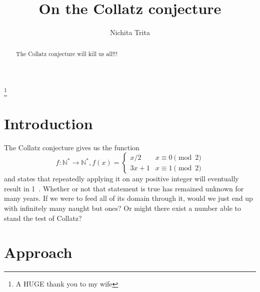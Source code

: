 \documentclass{proc-l}
\theoremstyle{definition}
\theoremstyle{remark}
\numberwithin{equation}{section}
\begin{document}
\title{On the Collatz conjecture}


\author{Nichita Trita}
\address{Metalurgiei 132, Bloc A, ap. 54, Bucharest, Romania}
\thanks{A HUGE thank you to my wife}






\begin{abstract}
The Collatz conjecture will kill us all!!!
\end{abstract}

\maketitle


\section{Introduction}

The Collatz conjecture gives us the function 
\[f : \mathbb{N}^{*} \rightarrow \mathbb{N}^{*}, f(x) = 
\begin{cases}
	x / 2 & x\equiv 0 \pmod 2\\
	3x + 1 & x\equiv 1 \pmod 2
\end{cases}\] and states that repeatedly applying it on any positive integer will eventually result in 1~\cite{Lagarias}. Whether or not that statement is true has remained unknown for many years. If we were to feed all of its domain through it, would we just end up with infinitely many naught but ones? Or might there exist a number able to stand the test of Collatz?

\section{Approach}
\end{document}
